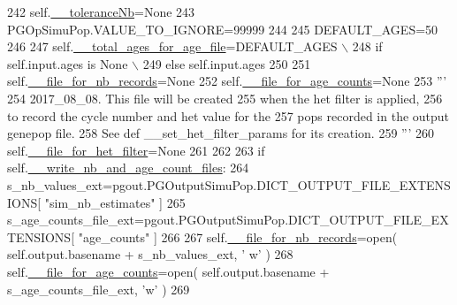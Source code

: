 \begin{DoxyCode}
242         self.\hyperlink{classnegui_1_1pgopsimupop_1_1PGOpSimuPop_acf4df87c7ff33e3bcef13e9f38cd995d}{\_\_toleranceNb}=\textcolor{keywordtype}{None}
243         PGOpSimuPop.VALUE\_TO\_IGNORE=99999
244 
245         DEFAULT\_AGES=50
246 
247         self.\hyperlink{classnegui_1_1pgopsimupop_1_1PGOpSimuPop_a0c1c7c18e092f64c4e7eccde8a216f09}{\_\_total\_ages\_for\_age\_file}=DEFAULT\_AGES \(\backslash\)
248                                         \textcolor{keywordflow}{if} self.input.ages \textcolor{keywordflow}{is} \textcolor{keywordtype}{None} \(\backslash\)
249                                                 \textcolor{keywordflow}{else} self.input.ages
250         
251         self.\hyperlink{classnegui_1_1pgopsimupop_1_1PGOpSimuPop_ae8398bc7a2a670b83630d4c9d4e56a38}{\_\_file\_for\_nb\_records}=\textcolor{keywordtype}{None}
252         self.\hyperlink{classnegui_1_1pgopsimupop_1_1PGOpSimuPop_aa2f1fd00202a2461dfc591cbbbdfa1b9}{\_\_file\_for\_age\_counts}=\textcolor{keywordtype}{None}
253         \textcolor{stringliteral}{'''}
254 \textcolor{stringliteral}{        2017\_08\_08. This file will be created}
255 \textcolor{stringliteral}{        when the het filter is applied,}
256 \textcolor{stringliteral}{        to record the cycle number and het value for the}
257 \textcolor{stringliteral}{        pops recorded in the output genepop file.   }
258 \textcolor{stringliteral}{        See def \_\_set\_het\_filter\_params for its creation. }
259 \textcolor{stringliteral}{        '''}
260         self.\hyperlink{classnegui_1_1pgopsimupop_1_1PGOpSimuPop_a495890e2a9edc8e449efd4a9caccca8d}{\_\_file\_for\_het\_filter}=\textcolor{keywordtype}{None}
261 
262         
263         \textcolor{keywordflow}{if} self.\hyperlink{classnegui_1_1pgopsimupop_1_1PGOpSimuPop_a55c874d7c0586a2d73f77390ff07e443}{\_\_write\_nb\_and\_age\_count\_files}:
264             s\_nb\_values\_ext=pgout.PGOutputSimuPop.DICT\_OUTPUT\_FILE\_EXTENSIONS[ \textcolor{stringliteral}{"sim\_nb\_estimates"} ]
265             s\_age\_counts\_file\_ext=pgout.PGOutputSimuPop.DICT\_OUTPUT\_FILE\_EXTENSIONS[ \textcolor{stringliteral}{"age\_counts"} ]
266 
267             self.\hyperlink{classnegui_1_1pgopsimupop_1_1PGOpSimuPop_ae8398bc7a2a670b83630d4c9d4e56a38}{\_\_file\_for\_nb\_records}=open( self.output.basename + s\_nb\_values\_ext, \textcolor{stringliteral}{'
      w'} )
268             self.\hyperlink{classnegui_1_1pgopsimupop_1_1PGOpSimuPop_aa2f1fd00202a2461dfc591cbbbdfa1b9}{\_\_file\_for\_age\_counts}=open( self.output.basename + 
      s\_age\_counts\_file\_ext, \textcolor{stringliteral}{'w'} )
269 

\end{DoxyCode}
